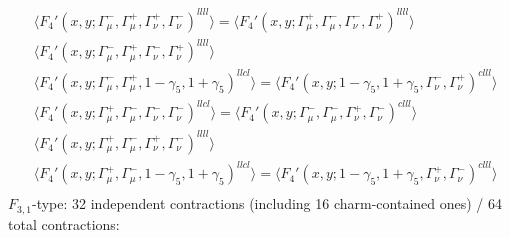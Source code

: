 \begin{align*}
&\Big\langle F_4'(x,y;\Gamma_\mu^-,\Gamma_\mu^+,\Gamma_\nu^+,\Gamma_\nu^-)^{llll}\Big\rangle
=\Big\langle F_4'(x,y;\Gamma_\mu^+,\Gamma_\mu^-,\Gamma_\nu^-,\Gamma_\nu^+)^{llll}\Big\rangle\\
&\Big\langle F_4'(x,y;\Gamma_\mu^-,\Gamma_\mu^+,\Gamma_\nu^-,\Gamma_\nu^+)^{llll}\Big\rangle\\
&\Big\langle F_4'(x,y;\Gamma_\mu^-,\Gamma_\mu^+,1-\gamma_5,1+\gamma_5)^{llcl}\Big\rangle
=\Big\langle F_4'(x,y;1-\gamma_5,1+\gamma_5,\Gamma_\nu^-,\Gamma_\nu^+)^{clll}\Big\rangle\\
&\Big\langle F_4'(x,y;\Gamma_\mu^+,\Gamma_\mu^-,\Gamma_\nu^-,\Gamma_\nu^-)^{llcl}\Big\rangle
=\Big\langle F_4'(x,y;\Gamma_\mu^-,\Gamma_\mu^-,\Gamma_\nu^+,\Gamma_\nu^-)^{clll}\Big\rangle\\
&\Big\langle F_4'(x,y;\Gamma_\mu^+,\Gamma_\mu^-,\Gamma_\nu^+,\Gamma_\nu^-)^{llll}\Big\rangle\\
&\Big\langle F_4'(x,y;\Gamma_\mu^+,\Gamma_\mu^-,1-\gamma_5,1+\gamma_5)^{llcl}\Big\rangle
=\Big\langle F_4'(x,y;1-\gamma_5,1+\gamma_5,\Gamma_\nu^+,\Gamma_\nu^-)^{clll}\Big\rangle\\
\end{align*}
$F_{3,1}$-type: 32 independent contractions (including 16 charm-contained ones) / 64 total contractions:
